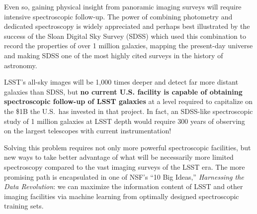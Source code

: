 

Even so, gaining physical insight from panoramic imaging surveys will require intensive spectroscopic follow-up.  The
power of combining photometry and dedicated spectroscopy is widely appreciated and perhaps best illustrated by the
success of the Sloan Digital Sky Survey (SDSS) which used this combination to record the properties of over 1 million
galaxies, mapping the present-day universe and making SDSS one of the most highly cited surveys in the history of
astronomy.


LSST's all-sky images will be 1,000 times deeper and detect far more
distant galaxies than SDSS, but \textbf{no current U.S. facility is
capable of obtaining spectroscopic follow-up of LSST galaxies} at a level
required to capitalize on the \$1B the U.S.\ has invested in that
project.  In fact, an SDSS-like spectroscopic study of 1 million
galaxies at LSST depth would require 300 years of observing on the
largest telescopes with current instrumentation!  

Solving this problem requires not only more powerful spectroscopic facilities, but new ways to take better advantage of
what will be necessarily more limited spectroscopy compared to the vast imaging surveys of the LSST era.  The more
promising path is encapsulated in one of NSF's ``10 Big Ideas,'' \emph{Harnessing the Data Revolution}: we can maximize
the information content of LSST and other imaging facilities via machine learning from optimally designed spectroscopic
training sets.

